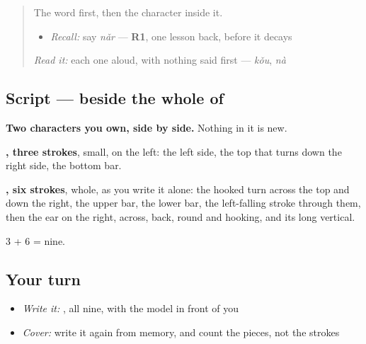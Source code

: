 \label{lesson:ZH-W86-na-where}



\begin{quote}
The word first, then the character inside it.

\begin{itemize}
\raggedright
  \item \emph{Recall:} say \emph{nǎr} — \textbf{R1}, one lesson back, before it decays
\end{itemize}

\begin{quote}
 
\end{quote}

\emph{Read it:} each one aloud, with nothing said first — \emph{kǒu}, \emph{nà}
\end{quote}

\subsection*{Script —  beside the whole of }

\begin{quote}
\end{quote}

\textbf{Two characters you own, side by side.} Nothing in it is new.

\textbf{, three strokes}, small, on the left: the left side, the top that turns down the right side, the bottom bar.

\textbf{, six strokes}, whole, as you write it alone: the hooked turn across the top and down the right, the upper bar, the lower bar, the left-falling stroke through them, then the ear on the right, across, back, round and hooking, and its long vertical.

3 + 6 = nine.

\subsection*{Your turn}
\begin{itemize}
\raggedright
  \item \emph{Write it:} , all nine, with the model in front of you
  \item \emph{Cover:} write it again from memory, and count the pieces, not the strokes
\end{itemize}

